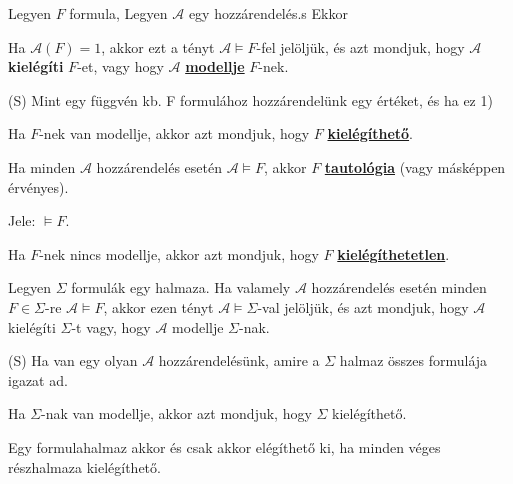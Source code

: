 \documentclass[10pt]{article}
\renewcommand{\\}{\par\noindent}
\begin{document}
\begin{frame}

\begin{tcolorbox}[squeezed title={Formula modellje, Kielégíthető, Tautológia, Kielégíthetetlen}]
Legyen $F$ formula, Legyen $\mathcal{A}$ egy hozzárendelés.s Ekkor\\
\bigskip
Ha $\mathcal{A}(F) = 1$, akkor ezt a tényt $\mathcal{A} \models F$-fel jelöljük, és azt mondjuk, hogy $\mathcal{A}$ \textbf{kielégíti} $F$-et, vagy hogy $\mathcal{A}$ \underline{\textbf{modellje}} $F$-nek.\\
{\tiny (S) Mint egy függvén kb. F formulához hozzárendelünk egy értéket, és ha ez 1)}\\
\bigskip
Ha $F$-nek van modellje, akkor azt mondjuk, hogy $F$ \underline{\textbf{kielégíthető}}.\\
\bigskip
Ha minden $\mathcal{A}$ hozzárendelés esetén $\mathcal{A} \models F$, akkor $F$ \underline{\textbf{tautológia}} (vagy másképpen érvényes).\\
Jele: $\models F$.\\
\bigskip
Ha $F$-nek nincs modellje, akkor azt mondjuk, hogy $F$ \underline{\textbf{kielégíthetetlen}}.\\
\bigskip
Legyen $\Sigma$ formulák egy halmaza. Ha valamely $\mathcal{A}$ hozzárendelés esetén minden $F \in \Sigma$-re $\mathcal{A} \models F$, akkor ezen tényt $\mathcal{A} \models \Sigma$-val jelöljük, és azt mondjuk, hogy $\mathcal{A}$ kielégíti $\Sigma$-t vagy, hogy $\mathcal{A}$ modellje $\Sigma$-nak.\\
{\tiny (S) Ha van egy olyan $\mathcal{A}$ hozzárendelésünk, amire a $\Sigma$ halmaz összes formulája igazat ad.}\\
\bigskip
Ha $\Sigma$-nak van modellje, akkor azt mondjuk, hogy $\Sigma$ kielégíthető.
\end{tcolorbox}
\end{frame}

\begin{frame}
\begin{tcolorbox}[title={Tétel: Az ítéletkalkulus kompaktsági tétele}]
Egy formulahalmaz akkor és csak akkor elégíthető ki, ha minden véges részhalmaza kielégíthető.
\end{tcolorbox}
\end{frame}
\end{document}
